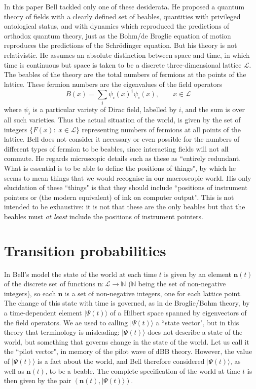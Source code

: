 \documentclass[12pt,a4paper,reqno]{article}
\renewcommand{\(}{\left(}
\renewcommand{\)}{\right)}
\renewcommand{\.}{\centerdot}
\newcommand{\n}{\mathbf{n}}
\newcommand{\N}{\mathbb{N}}
\renewcommand{\L}{\mathcal{L}}
\newcommand{\1}{\mathbf{1}}
\newcommand{\<}{\langle}
\renewcommand{\>}{\rangle}
\theoremstyle{definition}
\theoremstyle{remark}
\numberwithin{equation}{section}
\begin{document}
In this paper Bell tackled only one of these desiderata. He proposed a quantum theory of fields with a clearly defined set of beables, quantities with privileged ontological status, and with dynamics which reproduced the predictions of orthodox quantum theory, just as the Bohm/de Broglie equation of motion reproduces the predictions of the Schr\"odinger equation. But his theory is not relativistic. He assumes an absolute distinction between space and time, in which time is continuous but space is taken to be a discrete three-dimensional lattice $\mathcal{L}$. The beables of the theory are the total numbers of fermions at the points of the lattice. These fermion numbers are the eigenvalues of the field operators 
\[
B(x) = \sum_i \psi_i(x)^\dagger\psi_i(x), \qquad x\in\L
\]
where $\psi_i$ is a particular variety of Dirac field, labelled by $i$, and the sum is over all such varieties. Thus the actual situation of the world, is given by the set of integers $\{F(x):\; x\in\L\}$ representing numbers of fermions at all points of the lattice. Bell does not consider it necessary or even possible for the numbers of different types of fermion to be beables, since interacting fields will not all commute. He regards microscopic details such as these as ``entirely redundant. What is essential is to be able to define the positions of things", by which he seems to mean things that we would recognise in our macroscopic world. His only elucidation of these ``things" is that they should include ``positions of instrument pointers or (the modern equivalent) of ink on computer output". This is not intended to be exhaustive: it is not that these are the only beables but that the beables must \emph{at least} include the positions of instrument pointers.
 

\section{Transition probabilities}

In Bell's model the state of the world at each time $t$ is given by an element $\n(t)$ of the discrete set of functions $\n:\L\to\N$ ($\N$ being the set of non-negative integers), so each $\n$ is a set of non-negative integers, one for each lattice point. The change of this state with time is governed, as in de Broglie/Bohm theory, by a time-dependent element $|\Psi(t)\>$ of a Hilbert space spanned by eigenvectors of the field operators. We ae used to calling $|\Psi(t)\>$ a ``state vector", but in this theory that terminology is misleading: $|\Psi(t)\>$ does not describe a state of the world, but something that governs change in the state of the world. Let us call it the ``pilot vector", in memory of the pilot wave of dBB theory. However, the value of $|\Psi(t)\>$ is a fact about the world, and Bell therefore considered $|\Psi(t)\>$, as well as $\n(t)$, to be a beable. The complete specification of the world at time $t$ is then given by the pair $(\n(t),|\Psi(t)\>)$.
 
\end{document}
